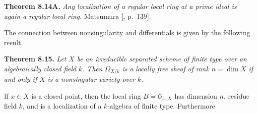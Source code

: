 {\medskip
\noindent\hypertarget{result-II-8.14A}{}\textbf{Theorem 8.14A.} \emph{Any localization of a regular local ring at a prime ideal is again a regular local ring.}
\Proof Matsumura [, p.~139].

\smallskip
The connection between nonsingularity and differentials is given by the following result.

\medskip
\noindent\hypertarget{result-II-8.15}{}\textbf{Theorem 8.15.} \emph{Let $X$ be an irreducible separated scheme of finite type over an algebraically closed field $k$. Then $\Omega_{X/k}$ is a locally free sheaf of rank $n=\dim X$ if and only if $X$ is a nonsingular variety over $k$.}

\Proof If $x\in X$ is a closed point, then the local ring $B=\mathcal O_{x,X}$ has dimension $n$, residue field $k$, and is a localization of a $k$-algebra of finite type. Furthermore
}
